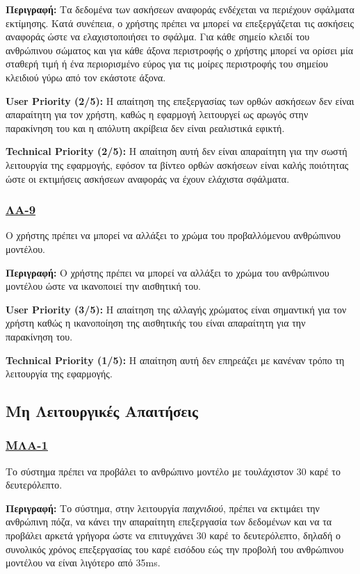 \noindent\textbf{Περιγραφή:} Τα δεδομένα των ασκήσεων αναφοράς ενδέχεται να περιέχουν σφάλματα εκτίμησης. Κατά συνέπεια, ο χρήστης πρέπει να μπορεί να επεξεργάζεται τις ασκήσεις αναφοράς ώστε να ελαχιστοποιήσει το σφάλμα. Για κάθε σημείο κλειδί του ανθρώπινου σώματος και για κάθε άξονα περιστροφής ο χρήστης μπορεί να ορίσει μία σταθερή τιμή ή ένα περιορισμένο εύρος για τις μοίρες περιστροφής του σημείου κλειδιού γύρω από τον εκάστοτε άξονα.

\noindent\textbf{User Priority (2/5):} Η απαίτηση της επεξεργασίας των ορθών ασκήσεων δεν είναι απαραίτητη για τον χρήστη, καθώς η εφαρμογή λειτουργεί ως αρωγός στην παρακίνηση του και η απόλυτη ακρίβεια δεν είναι ρεαλιστικά εφικτή.

\noindent\textbf{Technical Priority (2/5):} Η απαίτηση αυτή δεν είναι απαραίτητη για την σωστή λειτουργία της εφαρμογής, εφόσον τα βίντεο ορθών ασκήσεων είναι καλής ποιότητας ώστε οι εκτιμήσεις ασκήσεων αναφοράς να έχουν ελάχιστα σφάλματα. 

\subsubsection{\underline{ΛΑ-9}}
\noindent Ο χρήστης πρέπει να μπορεί να αλλάξει το χρώμα του προβαλλόμενου ανθρώπινου μοντέλου.

\noindent\textbf{Περιγραφή:} Ο χρήστης πρέπει να μπορεί να αλλάξει το χρώμα του ανθρώπινου μοντέλου ώστε να ικανοποιεί την αισθητική του.

\noindent\textbf{User Priority (3/5):} Η απαίτηση της αλλαγής χρώματος είναι σημαντική για τον χρήστη καθώς η ικανοποίηση της αισθητικής του είναι απαραίτητη για την παρακίνηση του.

\noindent\textbf{Technical Priority (1/5):} Η απαίτηση αυτή δεν επηρεάζει με κανέναν τρόπο τη λειτουργία της εφαρμογής.




\noindent\subsection{Μη Λειτουργικές Απαιτήσεις}

\subsubsection{\underline{ΜΛΑ-1}}
\noindent Το σύστημα πρέπει να προβάλει το ανθρώπινο μοντέλο με τουλάχιστον 30 καρέ το δευτερόλεπτο.

\noindent\textbf{Περιγραφή:} Το σύστημα, στην λειτουργία \textsl{παιχνιδιού}, πρέπει να εκτιμάει την ανθρώπινη πόζα, να κάνει την απαραίτητη επεξεργασία των δεδομένων και να τα προβάλει αρκετά γρήγορα ώστε να επιτυγχάνει 30 καρέ το δευτερόλεπτο, δηλαδή ο συνολικός χρόνος επεξεργασίας του καρέ εισόδου εώς την προβολή του ανθρώπινου μοντέλου να είναι λιγότερο από 35ms.

